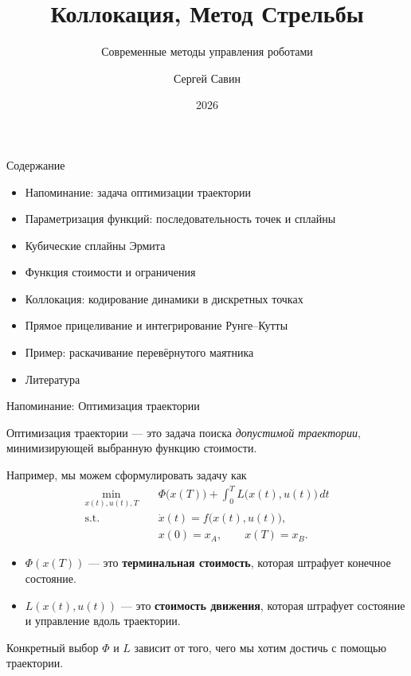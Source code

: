 \documentclass{beamer}
\subtitle{Современные методы управления роботами}
\author{Сергей Савин}
\date{2026}
\title{Коллокация, Метод Стрельбы}
\begin{document}
	\maketitle
	
	\begin{frame}{Содержание}
		\begin{itemize}
			\item Напоминание: задача оптимизации траектории
			\item Параметризация функций: последовательность точек и сплайны
			\item Кубические сплайны Эрмита
			\item Функция стоимости и ограничения
			\item Коллокация: кодирование динамики в дискретных точках
			\item Прямое прицеливание и интегрирование Рунге--Кутты
			\item Пример: раскачивание перевёрнутого маятника
			\item Литература
		\end{itemize}
	\end{frame}
	
	
	
	
	\begin{frame}{Напоминание: Оптимизация траектории}
		\begin{flushleft}
			Оптимизация траектории --- это задача поиска
			\emph{допустимой траектории}, минимизирующей выбранную
			функцию стоимости.
			
			\vspace{0.5em}
			
			Например, мы можем сформулировать задачу как
			\[
			\begin{aligned}
				\min_{x(t),u(t),T}\quad
				&
				\Phi\bigl(x(T)\bigr)
				+
				\int_0^T L\bigl(x(t),u(t)\bigr)\,dt
				\\
				\text{s.t.}\quad
				&
				\dot{x}(t)=f\bigl(x(t),u(t)\bigr),
				\\
				&
				x(0)=x_A,
				\qquad
				x(T)=x_B.
			\end{aligned}
			\]
			
			\begin{itemize}
				\item $\Phi(x(T))$ --- это \textbf{терминальная стоимость}, которая
				штрафует конечное состояние.
				
				\item $L(x(t),u(t))$ --- это \textbf{стоимость движения}, которая
				штрафует состояние и управление вдоль траектории.
			\end{itemize}
			
			Конкретный выбор $\Phi$ и $L$ зависит от того, чего
			мы хотим достичь с помощью траектории.
		\end{flushleft}
	\end{frame}
	
\end{document}
